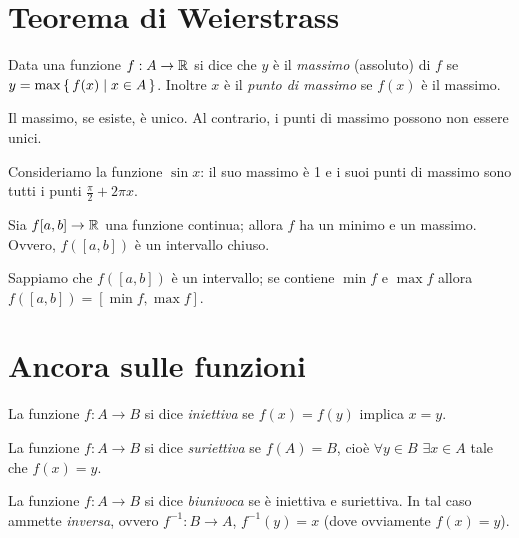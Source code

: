 \section{Teorema di Weierstrass}
\begin{definition}
Data una funzione $f: A \to \mathbb R$ si dice che $y$ è il \emph{massimo} (assoluto) di $f$ se $y = \max \set{f(x) | x \in A}$. Inoltre $x$ è il \emph{punto di massimo} se $f(x)$ è il massimo.
\end{definition}

\begin{remark}
Il massimo, se esiste, è unico. Al contrario, i punti di massimo possono non essere unici.
\end{remark}

\begin{example}
Consideriamo la funzione $\sin x$: il suo massimo è 1 e i suoi punti di massimo sono tutti i punti $\frac{\pi}{2} + 2\pi x$.
\end{example}

\begin{theorem}
Sia $f [a, b] \to \mathbb R$ una funzione continua; allora $f$ ha un minimo e un massimo. Ovvero, $f([a, b])$ è un intervallo chiuso.
\end{theorem}

Sappiamo che $f([a, b])$ è un intervallo; se contiene $\min f$ e $\max f$ allora $f([a, b]) = [\min f, \max f]$.

\section{Ancora sulle funzioni}

\begin{definition}
La funzione $f: A \to B$ si dice \emph{iniettiva} se $f(x) = f(y)$ implica $x = y$. 
\end{definition}

\begin{definition}
La funzione $f: A \to B$ si dice \emph{suriettiva} se $f(A) = B$, cioè $\forall y \in B$ $\exists x \in A$ tale che $f(x) = y$.
\end{definition}

\begin{definition}
La funzione $f: A \to B$ si dice \emph{biunivoca} se è iniettiva e suriettiva. In tal caso ammette \emph{inversa}, ovvero $f^{-1} : B \to A$, $f^{-1} (y) = x$ (dove ovviamente $f(x) = y$).
\end{definition}

